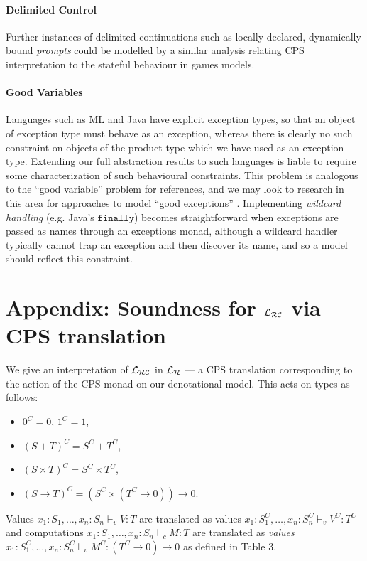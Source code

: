\documentclass{eptcs}
\newcommand{\emp}{{{0}}}
\newcommand{\Lr}{{\cal{L_R}}}
\newcommand{\Lc}{{\cal{L_{RC}}}}
\begin{document}
{\paragraph{Delimited Control}  Further instances of delimited continuations such as locally declared, dynamically bound \emph{prompts} \cite{GRR} could be modelled by a similar analysis relating CPS interpretation to the stateful behaviour in games models.
\paragraph{Good Variables} Languages such as ML and Java have explicit exception types, so that an object of exception type must behave as an exception, whereas there is clearly no such constraint on  objects of the product type which we have used as an exception type. Extending our full abstraction results to such languages is liable to require some characterization of such behavioural constraints. This problem is analogous to the ``good variable'' problem for references, and we may look to research in this area for approaches to model ``good exceptions''  \cite{ntex}. Implementing \emph{wildcard handling} (e.g. Java's $\mathtt{finally}$) becomes straightforward when exceptions are passed as names through an exceptions monad, although a wildcard handler typically cannot trap an exception and then discover its name, and so a model should reflect this constraint. 


\section*{Appendix: Soundness for $\Lc$ via CPS translation }
We give an interpretation of $\Lc$ in $\Lr$ --- a  CPS translation corresponding to the action of the CPS monad on our denotational model.  
This acts on types as follows:
\begin{itemize}
\item $0^C = 0$, $1^C = 1$,
\item $(S + T)^C = S^C + T^C$,
\item $(S \times T)^C = S^C \times T^C$,
\item $(S \rightarrow T)^C = (S^C \times (T^C \rightarrow \emp)) \rightarrow \emp$.
\end{itemize}
Values $x_1:S_1,\ldots,x_n:S_n \vdash_v V:T$ are translated as values $x_1:S_1^C,\ldots,x_n:S^C_n \vdash_v V^C:T^C$ and computations $x_1:S_1,\ldots,x_n:S_n \vdash_c M:T$ are translated as \emph{values} $x_1:S_1^C,\ldots,x_n:S^C_n \vdash_v M^C:(T^C \rightarrow 0)\rightarrow 0$ as defined in Table 3.

}
\end{document}
